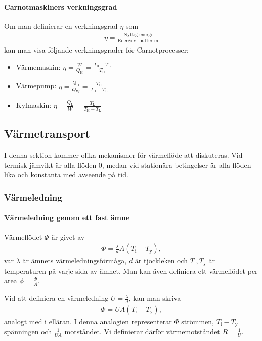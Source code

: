 \paragraph{Carnotmaskiners verkningsgrad}
Om man definierar en verkningsgrad $\eta$ som
\begin{align*}
	\eta = \frac{\text{Nyttig energi}}{\text{Energi vi putter in}}
\end{align*}
kan man visa följande verkningsgrader för Carnotprocesser:
\begin{itemize}
	\item Värmemaskin: $\eta = \frac{W}{Q_\text{H}} = \frac{T_\text{H} - T_\text{L}}{T_\text{H}}$
	\item Värmepump: $\eta = \frac{Q_\text{H}}{Q_\text{W}} = \frac{T_\text{H}}{T_\text{H} - T_\text{L}}$
	\item Kylmaskin: $\eta = \frac{Q_\text{L}}{W} = \frac{T_\text{L}}{T_\text{H} - T_\text{L}}$
\end{itemize}

\subsection{Värmetransport}

I denna sektion kommer olika mekanismer för värmeflöde att diskuteras. Vid termisk jämvikt är alla flöden $0$, medan vid stationära betingelser är alla flöden lika och konstanta med avseende på tid.

\subsubsection{Värmeledning}

\paragraph{Värmeledning genom ett fast ämne}
Värmeflödet $\Phi$ är givet av
\begin{align*}
	\Phi = \frac{\lambda}{d}A(T_\text{i} - T_\text{y}),
\end{align*}
var $\lambda$ är ämnets värmeledningsförmåga, $d$ är tjockleken och $T_\text{i}, T_\text{y}$ är temperaturen på varje sida av ämnet. Man kan även definiera ett värmeflödet per area $\phi = \frac{\Phi}{A}$.

Vid att definiera en värmeledning $U = \frac{\lambda}{d}$, kan man skriva
\begin{align*}
	\Phi = UA(T_\text{i} - T_\text{y}),
\end{align*}
analogt med i elläran. I denna analogien representerar $\Phi$ strömmen, $T_\text{i} - T_\text{y}$ spänningen och $\frac{1}{UA}$ motståndet. Vi definierar därför värmemotståndet $R = \frac{1}{U}$.

